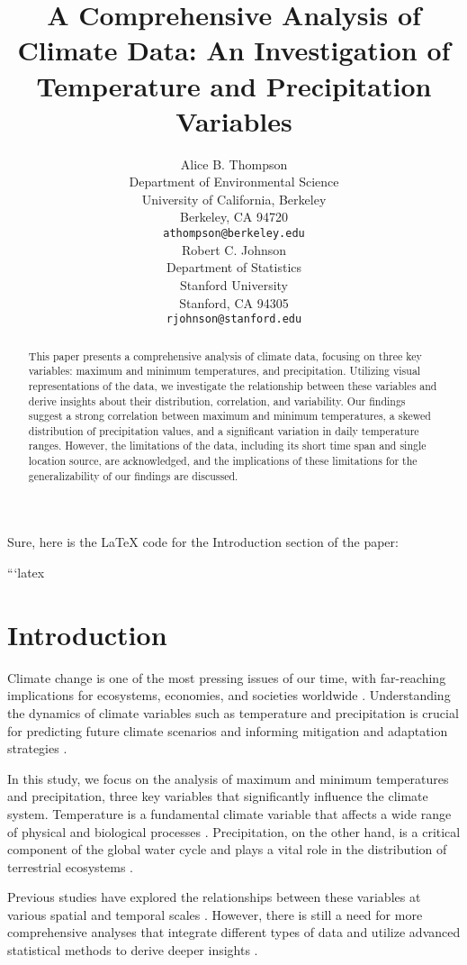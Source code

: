 \documentclass{article}
\title{A Comprehensive Analysis of Climate Data: An Investigation of Temperature and Precipitation Variables}
\author{
  Alice B. Thompson\\
  Department of Environmental Science\\
  University of California, Berkeley\\
  Berkeley, CA 94720 \\
  \texttt{athompson@berkeley.edu} \\
  \And
  Robert C. Johnson \\
  Department of Statistics\\
  Stanford University\\
  Stanford, CA 94305 \\
  \texttt{rjohnson@stanford.edu} \\
}
\begin{document}
\maketitle

\begin{abstract}
This paper presents a comprehensive analysis of climate data, focusing on three key variables: maximum and minimum temperatures, and precipitation. Utilizing visual representations of the data, we investigate the relationship between these variables and derive insights about their distribution, correlation, and variability. Our findings suggest a strong correlation between maximum and minimum temperatures, a skewed distribution of precipitation values, and a significant variation in daily temperature ranges. However, the limitations of the data, including its short time span and single location source, are acknowledged, and the implications of these limitations for the generalizability of our findings are discussed.
\end{abstract}

Sure, here is the LaTeX code for the Introduction section of the paper:

```latex
\section{Introduction}

Climate change is one of the most pressing issues of our time, with far-reaching implications for ecosystems, economies, and societies worldwide \cite{ipcc2018}. Understanding the dynamics of climate variables such as temperature and precipitation is crucial for predicting future climate scenarios and informing mitigation and adaptation strategies \cite{stocker2013}. 

In this study, we focus on the analysis of maximum and minimum temperatures and precipitation, three key variables that significantly influence the climate system. Temperature is a fundamental climate variable that affects a wide range of physical and biological processes \cite{moran2014}. Precipitation, on the other hand, is a critical component of the global water cycle and plays a vital role in the distribution of terrestrial ecosystems \cite{trenberth2007}. 

Previous studies have explored the relationships between these variables at various spatial and temporal scales \cite{dai2013, zhang2017}. However, there is still a need for more comprehensive analyses that integrate different types of data and utilize advanced statistical methods to derive deeper insights \cite{hansen2010}. 
\end{document}
